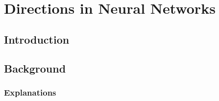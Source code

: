 \chapter{Directions in Neural Networks}\label{chapter5}

\section{Introduction}











\section{Background}

\subsection{Explanations}

